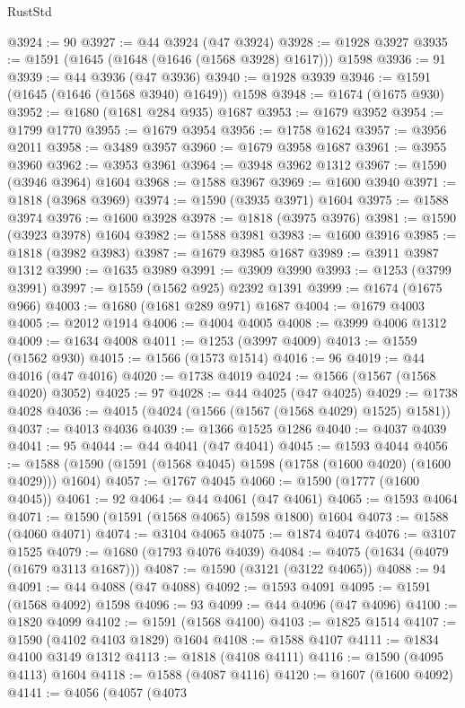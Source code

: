 \begin{lexlean}{RustStd}
\begin{coremodule}
@3924 := 90
@3927 := @44 @3924 (@47 @3924)
@3928 := @1928 @3927
@3935 := @1591 (@1645 (@1648 (@1646 (@1568 @3928) @1617))) @1598
@3936 := 91
@3939 := @44 @3936 (@47 @3936)
@3940 := @1928 @3939
@3946 := @1591 (@1645 (@1646 (@1568 @3940) @1649)) @1598
@3948 := @1674 (@1675 @930)
@3952 := @1680 (@1681 @284 @935) @1687
@3953 := @1679 @3952
@3954 := @1799 @1770
@3955 := @1679 @3954
@3956 := @1758 @1624
@3957 := @3956 @2011
@3958 := @3489 @3957
@3960 := @1679 @3958 @1687
@3961 := @3955 @3960
@3962 := @3953 @3961
@3964 := @3948 @3962 @1312
@3967 := @1590 (@3946 @3964) @1604
@3968 := @1588 @3967
@3969 := @1600 @3940
@3971 := @1818 (@3968 @3969)
@3974 := @1590 (@3935 @3971) @1604
@3975 := @1588 @3974
@3976 := @1600 @3928
@3978 := @1818 (@3975 @3976)
@3981 := @1590 (@3923 @3978) @1604
@3982 := @1588 @3981
@3983 := @1600 @3916
@3985 := @1818 (@3982 @3983)
@3987 := @1679 @3985 @1687
@3989 := @3911 @3987 @1312
@3990 := @1635 @3989
@3991 := @3909 @3990
@3993 := @1253 (@3799 @3991)
@3997 := @1559 (@1562 @925) @2392 @1391
@3999 := @1674 (@1675 @966)
@4003 := @1680 (@1681 @289 @971) @1687
@4004 := @1679 @4003
@4005 := @2012 @1914
@4006 := @4004 @4005
@4008 := @3999 @4006 @1312
@4009 := @1634 @4008
@4011 := @1253 (@3997 @4009)
@4013 := @1559 (@1562 @930)
@4015 := @1566 (@1573 @1514)
@4016 := 96
@4019 := @44 @4016 (@47 @4016)
@4020 := @1738 @4019
@4024 := @1566 (@1567 (@1568 @4020) @3052)
@4025 := 97
@4028 := @44 @4025 (@47 @4025)
@4029 := @1738 @4028
@4036 := @4015 (@4024 (@1566 (@1567 (@1568 @4029) @1525) @1581))
@4037 := @4013 @4036
@4039 := @1366 @1525 @1286
@4040 := @4037 @4039
@4041 := 95
@4044 := @44 @4041 (@47 @4041)
@4045 := @1593 @4044
@4056 := @1588 (@1590 (@1591 (@1568 @4045) @1598 (@1758 (@1600 @4020) (@1600 @4029))) @1604)
@4057 := @1767 @4045
@4060 := @1590 (@1777 (@1600 @4045))
@4061 := 92
@4064 := @44 @4061 (@47 @4061)
@4065 := @1593 @4064
@4071 := @1590 (@1591 (@1568 @4065) @1598 @1800) @1604
@4073 := @1588 (@4060 @4071)
@4074 := @3104 @4065
@4075 := @1874 @4074
@4076 := @3107 @1525
@4079 := @1680 (@1793 @4076 @4039)
@4084 := @4075 (@1634 (@4079 (@1679 @3113 @1687)))
@4087 := @1590 (@3121 (@3122 @4065))
@4088 := 94
@4091 := @44 @4088 (@47 @4088)
@4092 := @1593 @4091
@4095 := @1591 (@1568 @4092) @1598
@4096 := 93
@4099 := @44 @4096 (@47 @4096)
@4100 := @1820 @4099
@4102 := @1591 (@1568 @4100)
@4103 := @1825 @1514
@4107 := @1590 (@4102 @4103 @1829) @1604
@4108 := @1588 @4107
@4111 := @1834 @4100 @3149 @1312
@4113 := @1818 (@4108 @4111)
@4116 := @1590 (@4095 @4113) @1604
@4118 := @1588 (@4087 @4116)
@4120 := @1607 (@1600 @4092)
@4141 := @4056
    (@4057
      (@4073

\end{coremodule}
\end{lexlean}
